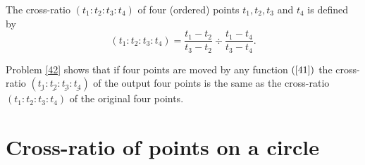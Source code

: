 \documentclass{ximera}
\begin{document}
\begin{definition}
\label{44}The cross-ratio $\left(  t_{1}:t_{2}:t_{3}:t_{4}\right)  $ of four
(ordered) points $t_{1},t_{2},t_{3}$ and $t_{4}$ is defined by%
\[
\left(  t_{1}:t_{2}:t_{3}:t_{4}\right)  =\frac{t_{1}-t_{2}}{t_{3}-t_{2}}%
\div\frac{t_{1}-t_{4}}{t_{3}-t_{4}}.
\]

\end{definition}

Problem \ref{42} shows that if four points are moved by any function $\left(
\ref{41}\right)  $ the cross-ratio $\left(  \underline{t_{1}}:\underline
{t_{2}}:\underline{t_{3}}:\underline{t_{4}}\right)  $ of the output four
points is the same as the cross-ratio $\left(  t_{1}:t_{2}:t_{3}:t_{4}\right)
$ of the original four points.












\section*{Cross-ratio of points on a circle}
\end{document}
